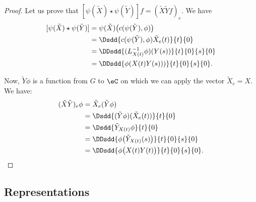\begin{proof}
	Let us prove that $[\psi(\tilde X)\star\psi(\tilde Y)]f=(\tilde X\tilde Yf)_e$. We have
	\begin{equation}
		\begin{split}
			[\psi(\tilde X)\star\psi(\tilde Y)] & =\psi(\tilde X)\big( c(\psi(\tilde Y),\phi) \big)   \\
			                                    & =\Dsdd{ c(\psi(\tilde Y),\phi)\tilde X_e(t) }{t}{0} \\
			                                    & =\DDsdd{ (L^{-1}_{X(t)}\phi)(Y(s)) }{t}{0}{s}{0}    \\
			                                    & =\DDsdd{ \phi(X(t)Y(s))) }{t}{0}{s}{0}.
		\end{split}
	\end{equation}

	Now, $\tilde Y\phi$ is a function from $G$ to $\eC$ on which we can apply the vector $\tilde X_e=X$. We have:
	\begin{equation}
		\begin{split}
			(\tilde X\tilde Y)_e\phi & =\tilde X_e(\tilde Y\phi)                                 \\
			                         & =\Dsdd{ (\tilde Y\phi)(\tilde X_e(t)) }{t}{0}             \\
			                         & =\Dsdd{ \tilde Y_{X(t)}\phi }{t}{0}                       \\
			                         & =\DDsdd{ \phi\big( \tilde Y_{X(t)}(s) \big) }{t}{0}{s}{0} \\
			                         & =\DDsdd{ \phi\big( X(t)Y(t) \big) }{t}{0}{s}{0}.
		\end{split}
	\end{equation}

\end{proof}

\subsection{Representations}

